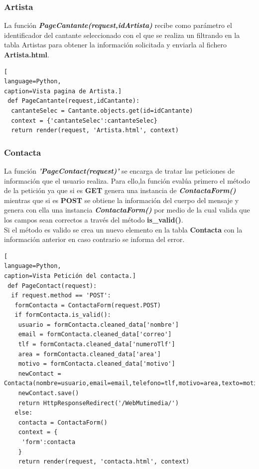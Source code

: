 \subsubsection*{Artista}
La función \textbf{\textit{PageCantante(request,idArtista)}} recibe como parámetro el identificador del cantante seleccionado con el que se realiza un filtrando en la tabla Artistas para obtener la información solicitada y enviarla  al fichero \textbf{Artista.html}.
\begin{lstlisting}[
language=Python,
caption=Vista pagina de Artista.]
 def PageCantante(request,idCantante):
  cantanteSelec = Cantante.objects.get(id=idCantante)
  context = {'cantanteSelec':cantanteSelec}
  return render(request, 'Artista.html', context)
\end{lstlisting}
\subsubsection*{Contacta} 
La función \textbf{\textit{'PageContact(request)'}} se encarga de tratar las peticiones de información que el usuario realiza. Para ello,la función evalúa primero el método de la petición ya que si es \textbf{GET} genera una instancia de \textit{\textbf{ContactaForm()}} mientras que si es \textbf{POST} se obtiene la información del cuerpo del mensaje y genera con ella una instancia \textbf{\textit{ContactaForm()}} por medio de la cual valida que los campos sean correctos a través del método \textbf{is\_valid()}.
\\Si el método es valido se crea un nuevo elemento en la tabla \textbf{Contacta} con la información anterior en caso contrario se informa del error.
\begin{lstlisting}[
language=Python,
caption=Vista Petición del contacta.]
 def PageContact(request):
  if request.method == 'POST':
   formContacta = ContactaForm(request.POST)
   if formContacta.is_valid():
    usuario = formContacta.cleaned_data['nombre']
    email = formContacta.cleaned_data['correo']
    tlf = formContacta.cleaned_data['numeroTlf']
    area = formContacta.cleaned_data['area']
    motivo = formContacta.cleaned_data['motivo']
    newContact = Contacta(nombre=usuario,email=email,telefono=tlf,motivo=area,texto=motivo);
    newContact.save()
    return HttpResponseRedirect('/WebMutimedia/')
   else:
    contacta = ContactaForm()
    context = {
     'form':contacta
    }
    return render(request, 'contacta.html', context)
\end{lstlisting}
